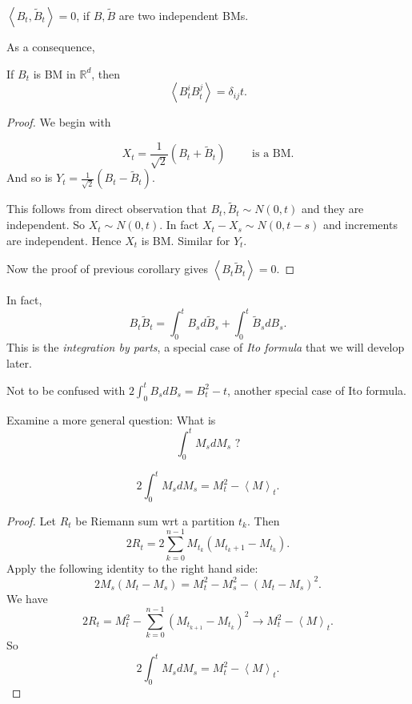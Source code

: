 \begin{example}
$\left\langle B_t, \tilde B_t \right\rangle = 0$, if $B, \tilde B$ are two independent BMs. 
\end{example}
As a consequence,
\begin{corollary}
	If $B_t$ is BM in $\mathbb{R}^d$, then 
	\[
		\left\langle B_t^i B_t^j \right\rangle = \delta_{i j} t
	.\] 
\end{corollary}
\begin{proof}
	We begin with
\begin{claim}
	\[
		X_t = \frac{1}{\sqrt{2} } \left( B_t + \tilde B_t \right)  \qquad \text{ is a BM}
	.\] 
	And so is $Y_t = \frac{1}{\sqrt{2} } (B_t- \tilde B_t)$.
\end{claim}
This follows from direct observation that $B_t, \tilde B_t \sim N\left( 0,t \right) $ and they are independent. So $X_t \sim N(0,t)$. In fact $X_t - X_s \sim N(0,t -s )$ and increments are independent. Hence $X_t$ is BM. Similar for $Y_t$.

Now the proof of previous corollary gives $\left\langle B_t \tilde B_t \right\rangle = 0$.
\end{proof}

In fact,
\[
	B_t \tilde B_t = \int_0^t B_s d \tilde B_s + \int_0^t \tilde B_s d B_s
.\] 
This is the \textit{integration by parts}, a special case of \textit{Ito formula} that we will develop later. 

Not to be confused with $2 \int _0^t B_s d B_s = B_t^2 - t$, another special case of Ito formula.

Examine a more general question: What is 
\[
	\int _0^t M_s d M_s \text{ ?}
\] 
\begin{claim}
	\[
	2 \int _0^t M_s d M_s = M_t^2 - \left\langle M \right\rangle _t
.\]
\end{claim}
\begin{proof}
	Let $R_t$ be Riemann sum wrt a partition $t_k$. Then
\[
	2 R_t = 2 \sum_{k = 0}^{n - 1} M_{t_k} \left( M_{t_k+1} - M_{t_k} \right) 
.\] 
Apply the following identity to the right hand side:
\[
	2 M_s (M_t - M_s) = M_t^2 - M_s^2 - (M_t - M_s)^2
.\] 
We have
\[
	2 R_t = M_t^2 - \sum_{k = 0}^{n - 1} \left( M_{t_{k+1}} - M_{t_k} \right)^2  
	\to  M_t^2 - \left\langle M \right\rangle _t
.\] 
So
\[
	2 \int _0^t M_s d M_s = M_t^2 - \left\langle M \right\rangle _t
.\] 
\end{proof}


